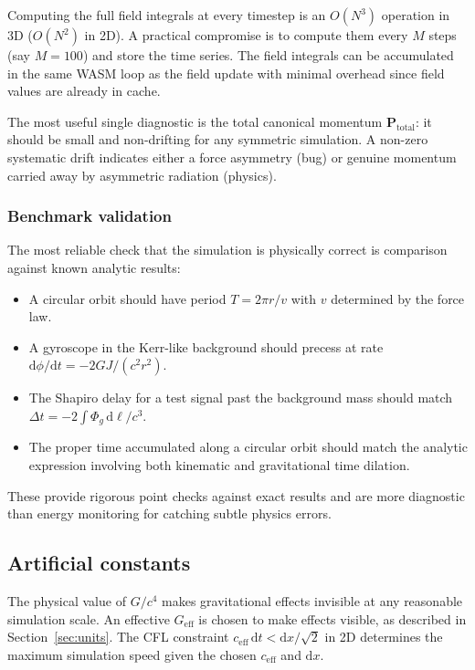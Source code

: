 \documentclass[11pt,a4paper]{article}
\newcommand{\vv}[1]{\mathbf{#1}}
\newcommand{\Phig}{\Phi_g}
\newcommand{\dd}{\mathrm{d}}
\begin{document}
Computing the full field integrals at every timestep is an $O(N^3)$ operation in 3D ($O(N^2)$ in 2D).  A practical compromise is to compute them every $M$ steps (say $M=100$) and store the time series.  The field integrals can be accumulated in the same WASM loop as the field update with minimal overhead since field values are already in cache.

The most useful single diagnostic is the total canonical momentum $\vv{P}_{\mathrm{total}}$: it should be small and non-drifting for any symmetric simulation.  A non-zero systematic drift indicates either a force asymmetry (bug) or genuine momentum carried away by asymmetric radiation (physics).

\subsubsection*{Benchmark validation}

The most reliable check that the simulation is physically correct is comparison against known analytic results:
\begin{itemize}
  \item A circular orbit should have period $T = 2\pi r/v$ with $v$ determined by the force law.
  \item A gyroscope in the Kerr-like background should precess at rate $\dd\phi/\dd t = -2GJ/(c^2r^2)$.
  \item The Shapiro delay for a test signal past the background mass should match $\Delta t = -2\int\Phig\,\dd\ell/c^3$.
  \item The proper time accumulated along a circular orbit should match the analytic expression involving both kinematic and gravitational time dilation.
\end{itemize}
These provide rigorous point checks against exact results and are more diagnostic than energy monitoring for catching subtle physics errors.

\subsection{Artificial constants}

The physical value of $G/c^4$ makes gravitational effects invisible at any reasonable simulation scale.  An effective $G_{\mathrm{eff}}$ is chosen to make effects visible, as described in Section~\ref{sec:units}.  The CFL constraint $c_{\mathrm{eff}}\,\dd t < \dd x/\sqrt{2}$ in 2D determines the maximum simulation speed given the chosen $c_{\mathrm{eff}}$ and $\dd x$.
\end{document}
